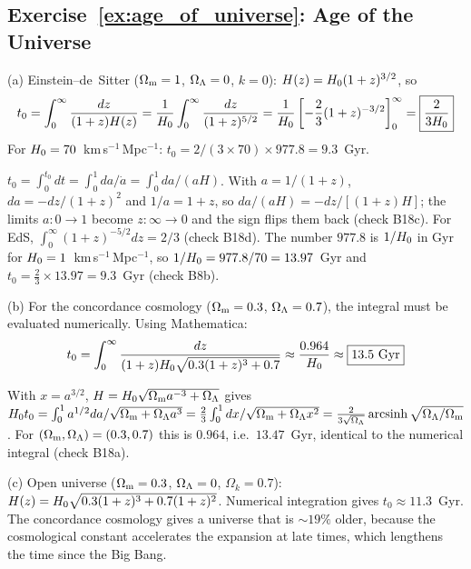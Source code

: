 \subsection*{Exercise~\ref{ex:age_of_universe}: Age of the Universe}

(a) Einstein--de~Sitter ($\Omega_{\mathrm{m}} = 1$, $\Omega_{\Lambda} = 0$, $k=0$):
$H(z) = H_0(1+z)^{3/2}$, so
\[
    t_0 = \int_0^\infty \frac{dz}{(1+z)H(z)}
    = \frac{1}{H_0}\int_0^\infty \frac{dz}{(1+z)^{5/2}}
    = \frac{1}{H_0}\left[-\frac{2}{3}(1+z)^{-3/2}\right]_0^\infty
    = \boxed{\frac{2}{3H_0}}
\]
For $H_0 = 70$~km\,s$^{-1}$\,Mpc$^{-1}$:
$t_0 = 2/(3 \times 70) \times 977.8 = 9.3$~Gyr.


\begin{derivation}
$t_0 = \int_0^{t_0}dt = \int_0^1 da/\dot a = \int_0^1 da/(aH)$.  With
$a = 1/(1+z)$, $da = -dz/(1+z)^2$ and $1/a = 1+z$, so
$da/(aH) = -dz/[(1+z)H]$; the limits $a: 0\to1$ become $z: \infty\to0$ and the
sign flips them back (check B18c).  For EdS, $\int_0^\infty(1+z)^{-5/2}dz = 2/3$
(check B18d).  The number $977.8$ is $1/H_0$ in Gyr for
$H_0 = 1$~km\,s$^{-1}$\,Mpc$^{-1}$, so $1/H_0 = 977.8/70 = 13.97$~Gyr and
$t_0 = \tfrac23\times13.97 = 9.3$~Gyr (check B8b).
\end{derivation}
(b) For the concordance cosmology ($\Omega_{\mathrm{m}} = 0.3$,
$\Omega_{\Lambda} = 0.7$), the integral must be evaluated numerically.
Using Mathematica:
\[
    t_0 = \int_0^\infty \frac{dz}{(1+z)H_0\sqrt{0.3(1+z)^3 + 0.7}}
    \approx \frac{0.964}{H_0}
    \approx \boxed{13.5~\text{Gyr}}
\]


\begin{derivation}
With $x = a^{3/2}$, $H = H_0\sqrt{\Omega_{\mathrm{m}} a^{-3} + \Omega_{\Lambda}}$ gives
$H_0 t_0 = \int_0^1 a^{1/2}da/\sqrt{\Omega_{\mathrm{m}} + \Omega_{\Lambda} a^3}
= \tfrac{2}{3}\int_0^1 dx/\sqrt{\Omega_{\mathrm{m}} + \Omega_{\Lambda} x^2}
= \frac{2}{3\sqrt{\Omega_{\Lambda}}}\operatorname{arcsinh}\sqrt{\Omega_{\Lambda}/\Omega_{\mathrm{m}}}$.
For $(\Omega_{\mathrm{m}},\Omega_{\Lambda}) = (0.3, 0.7)$ this is $0.964$, i.e.\ $13.47$~Gyr,
identical to the numerical integral (check B18a).
\end{derivation}
(c) Open universe ($\Omega_{\mathrm{m}} = 0.3$, $\Omega_{\Lambda} = 0$,
$\Omega_k = 0.7$): $H(z) = H_0\sqrt{0.3(1+z)^3 + 0.7(1+z)^2}$.
Numerical integration gives $t_0 \approx 11.3$~Gyr.  The concordance
cosmology gives a universe that is $\sim 19\%$ older, because the
cosmological constant accelerates the expansion at late times, which
lengthens the time since the Big Bang.


